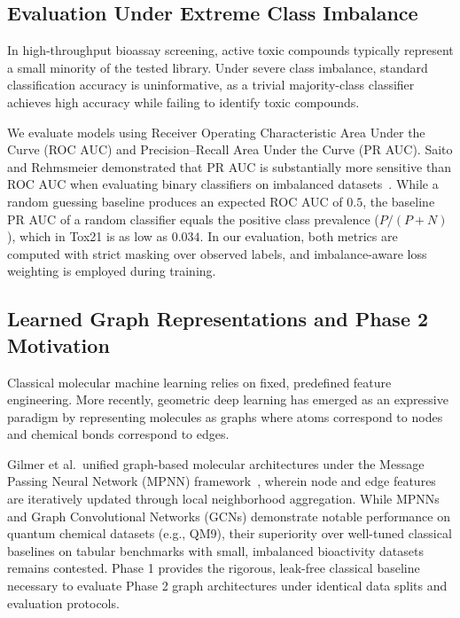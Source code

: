 \subsection{Evaluation Under Extreme Class Imbalance}

In high-throughput bioassay screening, active toxic compounds typically represent a small minority of the tested library. Under severe class imbalance, standard classification accuracy is uninformative, as a trivial majority-class classifier achieves high accuracy while failing to identify toxic compounds.

We evaluate models using Receiver Operating Characteristic Area Under the Curve (ROC AUC) and Precision--Recall Area Under the Curve (PR AUC). Saito and Rehmsmeier demonstrated that PR AUC is substantially more sensitive than ROC AUC when evaluating binary classifiers on imbalanced datasets~\cite{saito2015precision}. While a random guessing baseline produces an expected ROC AUC of $0.5$, the baseline PR AUC of a random classifier equals the positive class prevalence ($P/(P+N)$), which in Tox21 is as low as $0.034$. In our evaluation, both metrics are computed with strict masking over observed labels, and imbalance-aware loss weighting is employed during training.

\subsection{Learned Graph Representations and Phase 2 Motivation}

Classical molecular machine learning relies on fixed, predefined feature engineering. More recently, geometric deep learning has emerged as an expressive paradigm by representing molecules as graphs where atoms correspond to nodes and chemical bonds correspond to edges.

Gilmer et al.\ unified graph-based molecular architectures under the Message Passing Neural Network (MPNN) framework~\cite{gilmer2017neural}, wherein node and edge features are iteratively updated through local neighborhood aggregation. While MPNNs and Graph Convolutional Networks (GCNs) demonstrate notable performance on quantum chemical datasets (e.g., QM9), their superiority over well-tuned classical baselines on tabular benchmarks with small, imbalanced bioactivity datasets remains contested. Phase 1 provides the rigorous, leak-free classical baseline necessary to evaluate Phase 2 graph architectures under identical data splits and evaluation protocols.